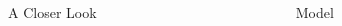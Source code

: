 \documentclass[final,t]{beamer}
\begin{document}
\begin{frame}{}
\begin{columns}[t]
\begin{column}{.34\linewidth}
\begin{block}{A Closer Look}

      \end{block}
\end{column}

\begin{column}{.29\linewidth}
\begin{block}{Model}


\end{block}
\end{column}
\end{columns}
\end{frame}
\end{document}
